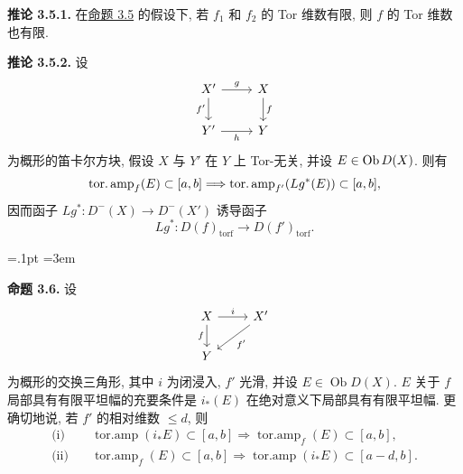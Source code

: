 \textbf{推论 3.5.1.} 在\hyperlink{sga6.e03.prop.3-5}{命题 3.5} 的假设下, 若 \(f_1\) 和 \(f_2\) 的 Tor 维数有限, 则 \(f\) 的 Tor 维数也有限.

\textbf{推论 3.5.2.} 设
\[
\begin{tikzcd}
X' \arrow[r,"g"] \arrow[d,"f'"'] & X \arrow[d,"f"]\\
Y' \arrow[r,"h"'] & Y
\end{tikzcd}
\]
为概形的笛卡尔方块, 假设 \(X\) 与 \(Y'\) 在 \(Y\) 上 Tor-无关, 并设 \(E\in \Ob D(X)\). 则有
\[
  \operatorname{tor.amp}_f(E)\subset[a,b]\Longrightarrow
  \operatorname{tor.amp}_{f'}(Lg^*(E))\subset[a,b],
\]
因而函子 \(Lg^*:D^{-}(X)\to D^{-}(X')\) 诱导函子
\[
  Lg^*:D(f)_{\mathrm{torf}}\longrightarrow D(f')_{\mathrm{torf}} .
\]



\providecommand{\Ob}{\operatorname{Ob}}
\providecommand{\D}{\mathrm D}
\providecommand{\Ho}{\mathrm H}
\providecommand{\RHom}{\mathrm R\!\operatorname{Hom}}
\providecommand{\parfamp}{\operatorname{parf.amp}}
\providecommand{\tamp}{\operatorname{tor.amp}}
\providecommand{\Qcoh}{\operatorname{Qcoh}}
\providecommand{\Mod}{\operatorname{Mod}}
\providecommand{\Coh}{\operatorname{Coh}}
\providecommand{\Lib}{\operatorname{Lib}}
\providecommand{\Loclib}{\operatorname{Loclib}}
\providecommand{\qcoh}{\mathrm{qcoh}}
\providecommand{\coh}{\mathrm{coh}}
\providecommand{\parf}{\mathrm{parf}}
\providecommand{\torf}{\mathrm{torf}}
\providecommand{\id}{\operatorname{id}}
\providecommand{\Coker}{\operatorname{Coker}}
\providecommand{\rank}{\operatorname{rank}}
\providecommand{\rg}{\operatorname{rg}}
\providecommand{\Hom}{\operatorname{Hom}}
\providecommand{\Ext}{\operatorname{Ext}}
\providecommand{\Spec}{\operatorname{Spec}}
\providecommand{\Cone}{\operatorname{Cone}}
\providecommand{\pt}{\operatorname{Pt}}
\providecommand{\ind}{\operatorname{ind}}
\hfuzz=.1pt %
\emergencystretch=3em

\textbf{命题 3.6.} 设
\[
\begin{tikzcd}
X \arrow[r,"i"] \arrow[d,"f"'] & X' \arrow[dl,"f'"]\\
Y &
\end{tikzcd}
\]
为概形的交换三角形, 其中 \(i\) 为闭浸入, \(f'\) 光滑, 并设 \(E\in\Ob D(X)\). \(E\) 关于 \(f\) 局部具有有限平坦幅的充要条件是 \(i_*(E)\) 在绝对意义下局部具有有限平坦幅. 更确切地说, 若 \(f'\) 的相对维数 \(\leq d\), 则
\begin{align*}
\text{(i)}\quad &\tamp(i_*E)\subset[a,b] \Longrightarrow \tamp_f(E)\subset[a,b],\\
\text{(ii)}\quad &\tamp_f(E)\subset[a,b] \Longrightarrow \tamp(i_*E)\subset[a-d,b].
\end{align*}


